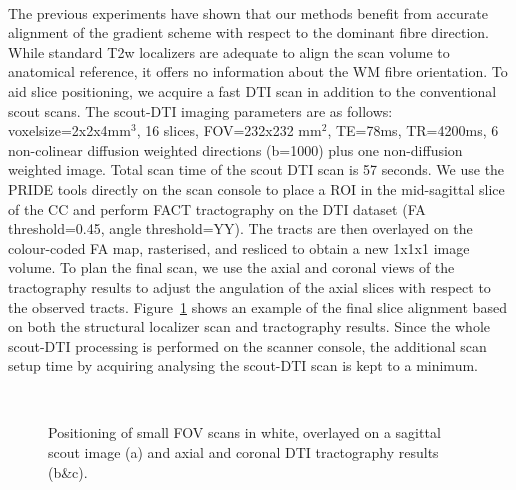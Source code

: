 \paragraph{}
The previous experiments have shown that our \SF{} methods benefit from accurate alignment of the gradient scheme with respect to the dominant fibre direction. While standard T2w localizers are adequate to align the scan volume to anatomical reference, it offers no information about the WM fibre orientation. To aid slice positioning, we acquire a fast DTI scan in addition to the conventional scout scans. The scout-DTI imaging parameters are as follows: voxelsize=2x2x4mm$^3$, 16 slices, FOV=232x232 mm$^2$, TE=78ms, TR=4200ms, 6 non-colinear diffusion weighted directions (b=1000) plus one non-diffusion weighted image. Total scan time of the scout DTI scan is 57 seconds. We use the PRIDE tools directly on the scan console to place a \gls{ROI} in the mid-sagittal slice of the \gls{CC} and perform FACT tractography on the DTI dataset (FA threshold=0.45, angle threshold=YY). The tracts are then overlayed on the colour-coded FA map, rasterised, and resliced to obtain a new 1x1x1 image volume. To plan the final \SF{} scan, we use the axial and coronal views of the tractography results to adjust the angulation of the axial slices with respect to the observed tracts.  Figure~\ref{fig:chap9 FOV positioning} shows an example of the final slice alignment based on both the structural localizer scan and tractography results. Since the whole scout-DTI processing is performed on the scanner console, the additional scan setup time by acquiring analysing the scout-DTI scan is kept to a minimum.

\begin{figure}[ht]
	\centering
	\begin{minipage}{0.35\textwidth}
	\\
	\end{minipage}\hspace{0.05\textwidth}
	\begin{minipage}{0.53\textwidth}
	\end{minipage}
	
	\caption{Positioning of small FOV scans in white, overlayed on a sagittal scout image (a) and axial and coronal DTI tractography results (b\&c).}
	\label{fig:chap9 FOV positioning}	
\end{figure}
